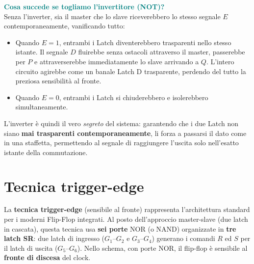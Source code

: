 \medskip
\noindent\textcolor{teal}{\textbf{Cosa succede se togliamo l'invertitore (NOT)?}}\\
Senza l'inverter, sia il master che lo slave riceverebbero lo stesso segnale $E$ contemporaneamente, vanificando tutto:
\begin{itemize}[leftmargin=1.5em,itemsep=2pt]
  \item Quando $E=1$, entrambi i Latch diventerebbero trasparenti nello stesso istante. Il segnale $D$ fluirebbe senza ostacoli attraverso il master, passerebbe per $P$ e attraverserebbe immediatamente lo slave arrivando a $Q$. L'intero circuito agirebbe come un banale Latch D trasparente, perdendo del tutto la preziosa sensibilità al fronte.
  \item Quando $E=0$, entrambi i Latch si chiuderebbero e isolerebbero simultaneamente.
\end{itemize}
L'inverter è quindi il vero \emph{segreto} del sistema: garantendo che i due Latch non siano \textbf{mai trasparenti contemporaneamente}, li forza a passarsi il dato come in una staffetta, permettendo al segnale di raggiungere l'uscita solo nell'esatto istante della commutazione.


\section{Tecnica trigger-edge}

La \textbf{tecnica trigger-edge} (sensibile al fronte) rappresenta l'architettura standard per i moderni Flip-Flop integrati. Al posto dell'approccio master-slave (due latch in cascata), questa tecnica usa \textbf{sei porte} NOR (o NAND) organizzate in \textbf{tre latch SR}: due latch di ingresso ($G_1$--$G_2$ e $G_3$--$G_4$) generano i comandi $R$ ed $S$ per il latch di uscita ($G_5$--$G_6$). Nello schema, con porte NOR, il flip-flop è sensibile al \textbf{fronte di discesa} del clock.

